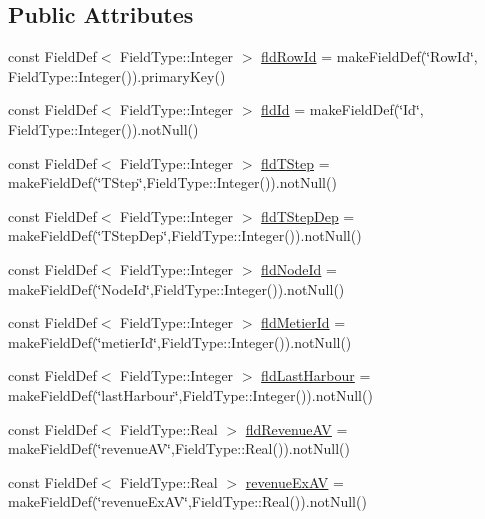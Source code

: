 \subsection*{Public Attributes}
\begin{DoxyCompactItemize}
\item 
const Field\+Def$<$ Field\+Type\+::\+Integer $>$ \mbox{\hyperlink{class_vessels_loglike_table_aeea370cbf8532b39a594484d508c6a6b}{fld\+Row\+Id}} = make\+Field\+Def(\char`\"{}Row\+Id\char`\"{}, Field\+Type\+::\+Integer()).primary\+Key()
\item 
const Field\+Def$<$ Field\+Type\+::\+Integer $>$ \mbox{\hyperlink{class_vessels_loglike_table_a2009922216ad19cc583f4ca8a9e40500}{fld\+Id}} = make\+Field\+Def(\char`\"{}Id\char`\"{}, Field\+Type\+::\+Integer()).not\+Null()
\item 
const Field\+Def$<$ Field\+Type\+::\+Integer $>$ \mbox{\hyperlink{class_vessels_loglike_table_a604a389b3099f0e67413b2330f33834f}{fld\+T\+Step}} = make\+Field\+Def(\char`\"{}T\+Step\char`\"{},Field\+Type\+::\+Integer()).not\+Null()
\item 
const Field\+Def$<$ Field\+Type\+::\+Integer $>$ \mbox{\hyperlink{class_vessels_loglike_table_acd43ce89ec5daacd7e0466b3cc1cdb0f}{fld\+T\+Step\+Dep}} = make\+Field\+Def(\char`\"{}T\+Step\+Dep\char`\"{},Field\+Type\+::\+Integer()).not\+Null()
\item 
const Field\+Def$<$ Field\+Type\+::\+Integer $>$ \mbox{\hyperlink{class_vessels_loglike_table_aed561c6f88f793d3b188932acef49c83}{fld\+Node\+Id}} = make\+Field\+Def(\char`\"{}Node\+Id\char`\"{},Field\+Type\+::\+Integer()).not\+Null()
\item 
const Field\+Def$<$ Field\+Type\+::\+Integer $>$ \mbox{\hyperlink{class_vessels_loglike_table_a4816c2052f8ace4871c371faaa03f50b}{fld\+Metier\+Id}} = make\+Field\+Def(\char`\"{}metier\+Id\char`\"{},Field\+Type\+::\+Integer()).not\+Null()
\item 
const Field\+Def$<$ Field\+Type\+::\+Integer $>$ \mbox{\hyperlink{class_vessels_loglike_table_a4551421d1b817e6043b4432b3c517028}{fld\+Last\+Harbour}} = make\+Field\+Def(\char`\"{}last\+Harbour\char`\"{},Field\+Type\+::\+Integer()).not\+Null()
\item 
const Field\+Def$<$ Field\+Type\+::\+Real $>$ \mbox{\hyperlink{class_vessels_loglike_table_abbaeb4d148ab4fba8c29ca5a076136bd}{fld\+Revenue\+AV}} = make\+Field\+Def(\char`\"{}revenue\+AV\char`\"{},Field\+Type\+::\+Real()).not\+Null()
\item 
const Field\+Def$<$ Field\+Type\+::\+Real $>$ \mbox{\hyperlink{class_vessels_loglike_table_af94e817342da849ce231d89472985831}{revenue\+Ex\+AV}} = make\+Field\+Def(\char`\"{}revenue\+Ex\+AV\char`\"{},Field\+Type\+::\+Real()).not\+Null()

\end{DoxyCompactItemize}

